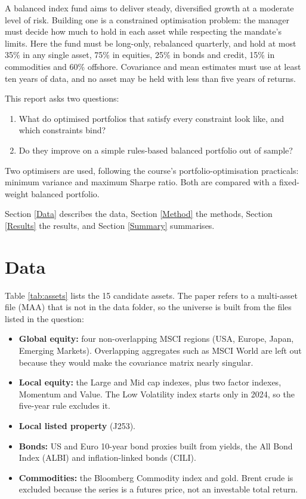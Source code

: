 \documentclass[11pt,preprint]{elsarticle}
\numberwithin{equation}{section}
\numberwithin{figure}{section}
\numberwithin{table}{section}
\def\tightlist{} %
\begin{document}
A balanced index fund aims to deliver steady, diversified growth at a
moderate level of risk. Building one is a constrained optimisation
problem: the manager must decide how much to hold in each asset while
respecting the mandate's limits. Here the fund must be long-only,
rebalanced quarterly, and hold at most 35\% in any single asset, 75\% in
equities, 25\% in bonds and credit, 15\% in commodities and 60\%
offshore. Covariance and mean estimates must use at least ten years of
data, and no asset may be held with less than five years of returns.

This report asks two questions:

\begin{enumerate}
\def\labelenumi{\arabic{enumi}.}
\tightlist
\item
  What do optimised portfolios that satisfy every constraint look like,
  and which constraints bind?
\item
  Do they improve on a simple rules-based balanced portfolio out of
  sample?
\end{enumerate}

Two optimisers are used, following the course's portfolio-optimisation
practicals: minimum variance and maximum Sharpe ratio. Both are compared
with a fixed-weight balanced portfolio.

Section \ref{Data} describes the data, Section \ref{Method} the methods,
Section \ref{Results} the results, and Section \ref{Summary} summarises.

\section{\texorpdfstring{Data \label{Data}}{Data }}\label{data}

Table \ref{tab:assets} lists the 15 candidate assets. The paper refers
to a multi-asset file (MAA) that is not in the data folder, so the
universe is built from the files listed in the question:

\begin{itemize}
\tightlist
\item
  \textbf{Global equity:} four non-overlapping MSCI regions (USA,
  Europe, Japan, Emerging Markets). Overlapping aggregates such as MSCI
  World are left out because they would make the covariance matrix
  nearly singular.
\item
  \textbf{Local equity:} the Large and Mid cap indexes, plus two factor
  indexes, Momentum and Value. The Low Volatility index starts only in
  2024, so the five-year rule excludes it.
\item
  \textbf{Local listed property} (J253).
\item
  \textbf{Bonds:} US and Euro 10-year bond proxies built from yields,
  the All Bond Index (ALBI) and inflation-linked bonds (CILI).
\item
  \textbf{Commodities:} the Bloomberg Commodity index and gold. Brent
  crude is excluded because the series is a futures price, not an
  investable total return.
\end{itemize}
\end{document}
